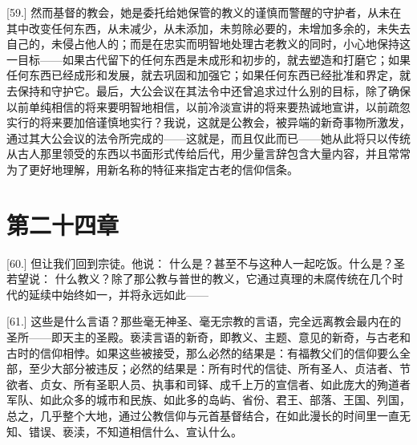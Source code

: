 [59.] 然而基督的教会，她是委托给她保管的教义的谨慎而警醒的守护者，从未在其中改变任何东西，从未减少，从未添加，未剪除必要的，未增加多余的，未失去自己的，未侵占他人的；而是在忠实而明智地处理古老教义的同时，小心地保持这一目标——如果古代留下的任何东西是未成形和初步的，就去塑造和打磨它；如果任何东西已经成形和发展，就去巩固和加强它；如果任何东西已经批准和界定，就去保持和守护它。最后，大公会议在其法令中还曾追求过什么别的目标，除了确保以前单纯相信的将来要明智地相信，以前冷淡宣讲的将来要热诚地宣讲，以前疏忽实行的将来要加倍谨慎地实行？我说，这就是公教会，被异端的新奇事物所激发，通过其大公会议的法令所完成的——这就是，而且仅此而已——她从此将只以传统从古人那里领受的东西以书面形式传给后代，用少量言辞包含大量内容，并且常常为了更好地理解，用新名称的特征来指定古老的信仰信条。\par


\section{第二十四章}

\par

[60.] 但让我们回到宗徒。他说：   什么是？甚至不与这种人一起吃饭。什么是？圣若望说： 什么教义？除了那公教与普世的教义，它通过真理的未腐传统在几个时代的延续中始终如一，并将永远如此——  \par

[61.]  这些是什么言语？那些毫无神圣、毫无宗教的言语，完全远离教会最内在的圣所——即天主的圣殿。亵渎言语的新奇，即教义、主题、意见的新奇，与古老和古时的信仰相悖。如果这些被接受，那么必然的结果是：有福教父们的信仰要么全部，至少大部分被违反；必然的结果是：所有时代的信徒、所有圣人、贞洁者、节欲者、贞女、所有圣职人员、执事和司铎、成千上万的宣信者、如此庞大的殉道者军队、如此众多的城市和民族、如此多的岛屿、省份、君王、部落、王国、列国，总之，几乎整个大地，通过公教信仰与元首基督结合，在如此漫长的时间里一直无知、错误、亵渎，不知道相信什么、宣认什么。\par

